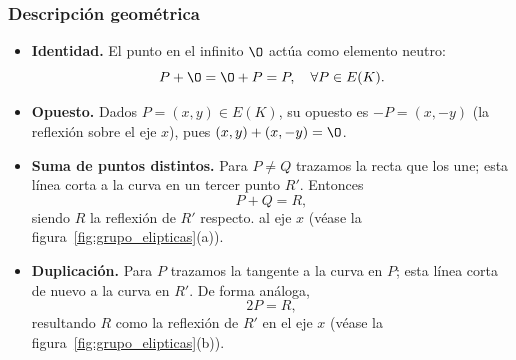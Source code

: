 \subsubsection*{Descripción geométrica}
\begin{itemize}
  \item \textbf{Identidad.} El punto en el infinito \(\O\) actúa como elemento neutro: 
    \[
      P + \O = \O + P = P,\quad\forall P\in E(K).
    \]
  \item \textbf{Opuesto.} Dados \(P=(x,y)\in E(K)\), su opuesto es \(-P=(x,-y)\) (la reflexión sobre el eje \(x\)), pues 
    \((x,y)+(x,-y)=\O\).
  \item \textbf{Suma de puntos distintos.} Para \(P\neq Q\) trazamos la recta que los une; esta línea corta a la curva en un tercer punto \(R'\). Entonces 
    \[
      P + Q = R,
    \]
    siendo \(R\) la reflexión de \(R'\) respecto. al eje \(x\) (véase la figura~\ref{fig:grupo_elipticas}(a)).
  \item \textbf{Duplicación.} Para \(P\) trazamos la tangente a la curva en \(P\); esta línea corta de nuevo a la curva en \(R'\). De forma análoga,
    \[
      2P = R,
    \]
    resultando \(R\) como la reflexión de \(R'\) en el eje \(x\) (véase la figura~\ref{fig:grupo_elipticas}(b)).
\end{itemize}

